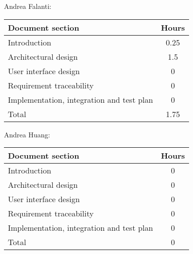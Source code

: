 Andrea Falanti:

\begin{tabular}{|l|c|}
    \hline
    Document section & Hours \\
    \hline
     Introduction & 0.25\\
     Architectural design & 1.5\\
     User interface design & 0\\
     Requirement traceability & 0\\
     Implementation, integration and test plan & 0\\
     \hline
     Total & 1.75\\
     \hline
\end{tabular}
\vskip 0.3in

Andrea Huang:

\begin{tabular}{|l|c|}
    \hline
    Document section & Hours \\
    \hline
     Introduction & 0\\
     Architectural design & 0\\
     User interface design & 0\\
     Requirement traceability & 0\\
     Implementation, integration and test plan & 0\\
     \hline
     Total & 0\\
     \hline
\end{tabular}